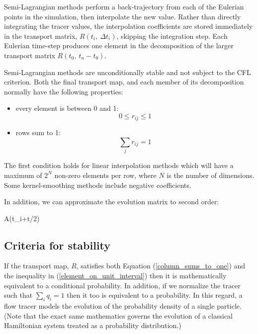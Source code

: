 Semi-Lagrangian methods perform a back-trajectory from each of the Eulerian
points in the simulation, then interpolate the new value.  Rather than
directly integrating the tracer values, 
the interpolation coefficients are stored immediately
in the transport matrix, $R(t_i,~\Delta t_i)$, skipping the integration
step.
Each Eulerian time-step produces one element in the decomposition of the
larger transport matrix $R(t_0,~t_n-t_0)$.

Semi-Lagrangian methods are unconditionally stable and not subject to the
CFL criterion.
Both the final transport map, and each member of its decomposition normally have
the following properties:
\begin{itemize}
\item every element is between 0 and 1:
\begin{equation}
0 \le r_{ij} \le 1
\label{element_on_unit_interval}
\end{equation}
\item rows sum to 1:
\begin{equation}
\sum_j r_{ij} = 1
\label{rowssumtoone}
\end{equation}
\end{itemize}
The first condition holds for linear interpolation methods which will have
a maximum of $2^N$ non-zero elements per row, 
where $N$ is the number of dimensions. 
Some kernel-smoothing methods include negative coefficients.

In addition, we can approximate the evolution matrix to second order:
\begin{eqnl}
A(t_i+\Delta t/2) \approx {} 
\end{eqnl}

\subsection{Criteria for stability}

If the transport map, $R$, satisfies both Equation (\ref{column_sums_to_one})
and the inequality in (\ref{element_on_unit_interval}) then it is mathematically
equivalent to a conditional probability.
In addition, if we normalize the tracer such that $\sum_i q_i=1$
then it too is equivalent to a probability.
In this regard, a flow tracer models the evolution of 
the probability density of a single particle.
(Note that the exact same mathematics governs the evolution of a classical
Hamiltonian system treated as a probability distribution.)

